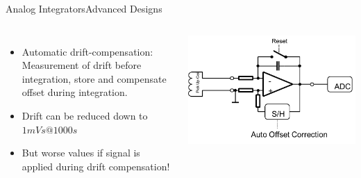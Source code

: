 \documentclass{beamer}
\begin{document}
\begin{frame}{Analog Integrators}{Advanced Designs}
\begin{columns}
	\begin{itemize}
		\item Automatic drift-compensation: Measurement of drift before integration, store and compensate offset during integration.
		\item<2-> Drift can be reduced down to   $1mVs @ 1000s$
		\item<3->  But worse values if signal  is applied during drift  compensation!
	\end{itemize}
	\begin{center}
	\includegraphics[width=0.8\columnwidth]{toreSupreInt.png}

	\end{center}
\end{columns}
\end{frame}

\end{document}
